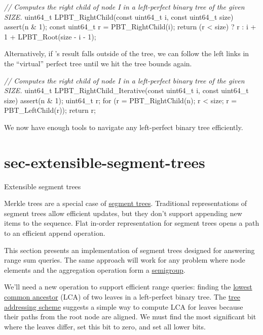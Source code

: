 \documentclass{article}
\begin{document}
\begin{code}[c]
\emph{// Computes the right child of node I in a left-perfect binary tree of the given SIZE.}
uint64_t LPBT_RightChild(const uint64_t i, const uint64_t size) {
    assert(n & 1);
    const uint64_t r = PBT_RightChild(i);
    return (r < size) ? r : i + 1 + LPBT_Root(size - i - 1);
}
\end{code}

Alternatively, if 's result falls outside of the tree, we can follow the left links in the ``virtual'' perfect tree until we hit the tree bounds again.

\begin{code}[c]
\emph{// Computes the right child of node I in a left-perfect binary tree of the given SIZE.}
uint64_t LPBT_RightChild_Iterative(const uint64_t i, const uint64_t size) {
    assert(n & 1);
    uint64_t r;
    for (r = PBT_RightChild(n); r < size; r = PBT_LeftChild(r));
    return r;
}
\end{code}

We now have enough tools to navigate any left-perfect binary tree efficiently.

\section{sec-extensible-segment-trees}{Extensible segment trees}

Merkle trees are a special case of \href{https://cp-algorithms.com/data_structures/segment_tree.html}{segment trees}.
Traditional representations of segment trees allow efficient updates, but they don't support appending new items to the sequence.
Flat in-order representation for segment trees opens a path to an efficient append operation.

This section presents an implementation of segment trees designed for answering range sum queries.
The same approach will work for any problem where node elements and the aggregation operation form a \href{https://en.wikipedia.org/wiki/Semigroup}{semigroup}.

We'll need a new operation to support efficient range queries: finding the \href{https://en.wikipedia.org/wiki/Lowest_common_ancestor}{lowest common ancestor} (LCA) of two leaves in a left-perfect binary tree.
The \href{#sec-addressing}{tree addressing scheme} suggests a simple way to compute LCA for leaves because their paths from the root node are aligned.
We must find the most significant bit where the leaves differ, set this bit to zero, and set all lower bits.
\end{document}
